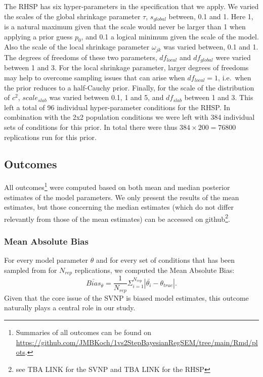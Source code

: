 \documentclass[
  man, donotrepeattitle,floatsintext]{apa6}
\begin{document}
The RHSP has six hyper-parameters in the specification that we apply. We varied the scales of the global shrinkage parameter \(\tau\), \(s_{global}\) between, 0.1 and 1. Here 1, is a natural maximum given that the scale would never be larger than 1 when applying a prior guess \(p_0\), and 0.1 a logical minimum given the scale of the model. Also the scale of the local shrinkage parameter \(\omega_{jk}\) was varied between, 0.1 and 1. The degrees of freedoms of these two parameters, \(df_{local}\) and \(df_{global}\) were varied between 1 and 3. For the local shrinkage parameter, larger degrees of freedoms may help to overcome sampling issues that can arise when \(df_{local} = 1\), i.e.~when the prior reduces to a half-Cauchy prior. Finally, for the scale of the distribution of \(c^2\), \(scale_{slab}\) was varied between 0.1, 1 and 5, and \(df_{slab}\) between 1 and 3. This left a total of 96 individual hyper-parameter conditions for the RHSP. In combination with the 2x2 population conditions we were left with 384 individual sets of conditions for this prior. In total there were thus \(384 \times 200 = 76800\) replications run for this prior.

\hypertarget{outcomes}{%
\subsection{Outcomes}\label{outcomes}}

All outcomes\footnote{Summaries of all outcomes can be found on \url{https://github.com/JMBKoch/1vs2StepBayesianRegSEM/tree/main/Rmd/plots}.} were computed based on both mean and median posterior estimates of the model parameters. We only present the results of the mean estimates, but those concerning the median estimates (which do not differ relevantly from those of the mean estimates) can be accessed on github\footnote{see TBA LINK for the SVNP and TBA LINK for the RHSP}.

\hypertarget{mean-absolute-bias}{%
\subsubsection{Mean Absolute Bias}\label{mean-absolute-bias}}

For every model parameter \(\theta\) and for every set of conditions that has been sampled from for \(N_{rep}\) replications, we computed the Mean Absolute Bias:
\[\bar{Bias}_{\bar{\theta}} = \frac{1}{N_{rep}} \Sigma_{i = 1}^{N_{rep}} |\bar{\theta_i} - \theta_{true}|.\]
Given that the core issue of the SVNP is biased model estimates, this outcome naturally plays a central role in our study.
\end{document}
